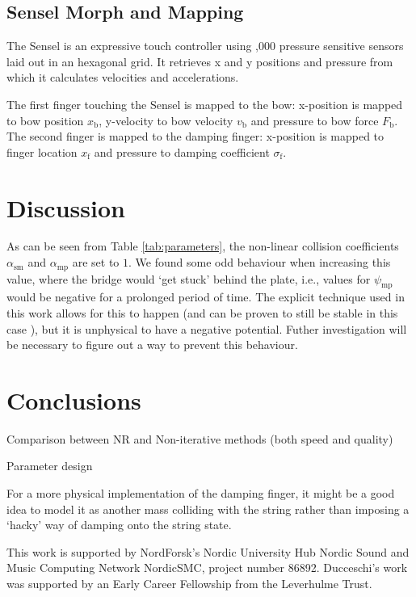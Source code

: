 \documentclass[dvipsnames, pdftex]{article}
\begin{document}
\subsection{Sensel Morph and Mapping}
The Sensel is an expressive touch controller using ,000 pressure sensitive sensors laid out in an hexagonal grid\cite{sensel2020}. It retrieves x and y positions and pressure from which it calculates velocities and accelerations.

The first finger touching the Sensel is mapped to the bow: x-position is mapped to bow position $x_\text{b}$, y-velocity to bow velocity $v_\text{b}$ and pressure to bow force $F_\text{b}$. The second finger is mapped to the damping finger: x-position is mapped to finger location $x_\text{f}$ and pressure to damping coefficient $\sigma_\text{f}$.
\section{Discussion}

As can be seen from Table \ref{tab:parameters}, the non-linear collision coefficients $\alpha_\text{sm}$ and $\alpha_\text{mp}$ are set to $1$. We found some odd behaviour when increasing this value, where the bridge would `get stuck' behind the plate, i.e., values for $\psi_\text{mp}$ would be negative for a prolonged period of time. The explicit technique used in this work allows for this to happen (and can be proven to still be stable in this case \cite{Ducceschi2019}), but it is unphysical to have a negative potential. Futher investigation will be necessary to figure out a way to prevent this behaviour.

\section{Conclusions}
Comparison between NR and Non-iterative methods (both speed and quality)

Parameter design

For a more physical implementation of the damping finger, it might be a good idea to model it as another mass colliding with the string rather than imposing a `hacky' way of damping onto the string state. 
\begin{acknowledgments}
This work is supported by NordForsk's Nordic
University Hub Nordic Sound and Music Computing Network
NordicSMC, project number 86892. Ducceschi's work was supported by an Early Career Fellowship from the Leverhulme Trust.
\end{acknowledgments} 


\end{document}

